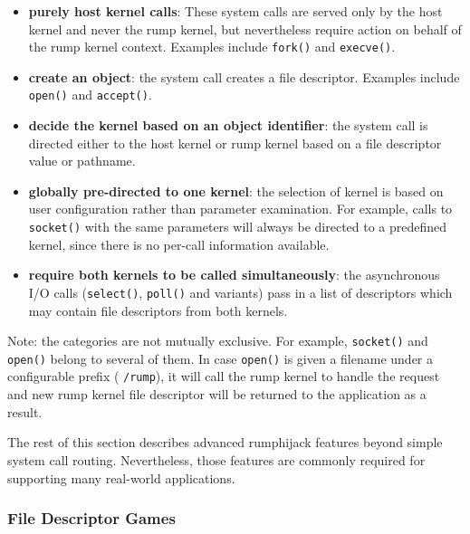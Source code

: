\begin{itemize}
\item	\textbf{purely host kernel calls}:
          These system calls are served only by the host kernel
          and never the rump kernel, but nevertheless require
          action on behalf of the rump kernel context.  Examples include
          \verb+fork()+ and \verb+execve()+.

\item	\textbf{create an object}: the system call creates a file descriptor.
          Examples include \verb+open()+ and \verb+accept()+.

\item	\textbf{decide the kernel based on an object identifier}: the system
          call is directed either to the host kernel or rump kernel
          based on a file descriptor value or pathname.

\item	\textbf{globally pre-directed to one kernel}: the selection of
          kernel is based on user configuration rather than parameter
          examination.  For example, calls to \verb+socket()+
          with the same parameters will always be directed to a
          predefined kernel, since there is no per-call information
          available.

\item	\textbf{require both kernels to be called simultaneously}:
	the asynchronous I/O calls (\verb+select()+, \verb+poll()+ and
	variants) pass in a list of descriptors which may contain file
	descriptors from both kernels.

\end{itemize}

Note: the categories are not mutually exclusive.  For example,
\verb+socket()+ and \verb+open()+ belong to several of them.  In
case \texttt{open()} is given a filename under a configurable prefix (\eg
\verb+/rump+), it will call the rump kernel to
handle the request and new rump kernel file descriptor will be
returned to the application as a result.

The rest of this section describes advanced rumphijack features
beyond simple system call routing.  Nevertheless, those features
are commonly required for supporting many real-world applications.

\subsubsection*{File Descriptor Games}
      
